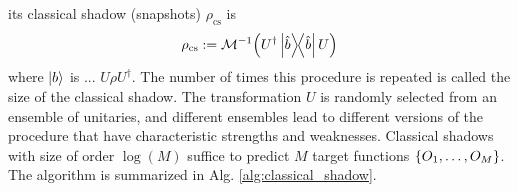 \documentclass[
reprint,
aps,
pra,
floatfix,
]{revtex4-2}
\theoremstyle{plain}
\newtheorem{theorem}{Theorem}
\newtheorem{lemma}{Lemma}
\theoremstyle{definition}
\newtheorem{definition}{Definition}
\newcommand{\ob}{O}
\newcommand{\dm}{\rho}
\newcommand{\cs}{\text{cs}}
\newcommand{\shadow}{\textup{shadow}}
\newcommand{\U}{U}
\begin{document}
its classical shadow (snapshots) $\dm_{\cs}$ is 
\begin{equation}
	\dm_{\cs} := \mathcal{M}^{-1} \qty(U^\dagger \op{\hat{b}} U)
\end{equation}
where $\ket{b}$ is ... $\U\dm\U^\dagger$.
The number of times this procedure is repeated is called the size of the classical shadow. 
The transformation $U$ is randomly selected from an ensemble of unitaries, and different ensembles lead to different versions of the procedure that have characteristic strengths and weaknesses.
Classical shadows with size of order $\log(M)$ suffice to predict $M$ target functions $\qty{\ob_1,\dots,\ob_M}$.
The algorithm is summarized in Alg. \ref{alg:classical_shadow}.
\end{document}
